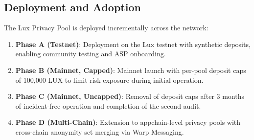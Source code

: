 \subsection{Deployment and Adoption}

The Lux Privacy Pool is deployed incrementally across the network:

\begin{enumerate}
    \item \textbf{Phase A (Testnet)}: Deployment on the Lux testnet with synthetic deposits, enabling community testing and ASP onboarding.
    \item \textbf{Phase B (Mainnet, Capped)}: Mainnet launch with per-pool deposit caps of 100,000 LUX to limit risk exposure during initial operation.
    \item \textbf{Phase C (Mainnet, Uncapped)}: Removal of deposit caps after 3 months of incident-free operation and completion of the second audit.
    \item \textbf{Phase D (Multi-Chain)}: Extension to appchain-level privacy pools with cross-chain anonymity set merging via Warp Messaging.
\end{enumerate}

